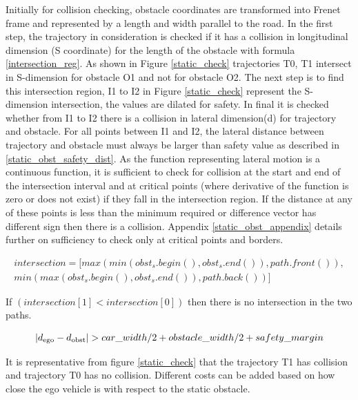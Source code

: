 Initially for collision checking, obstacle coordinates are transformed into Frenet frame and represented by a length and width parallel to the road. In the first step, the trajectory in consideration is checked if it has a collision in longitudinal dimension (S coordinate) for the length of the obstacle with formula \ref{intersection_reg}. As shown in Figure \ref{static_check} trajectories T0, T1 intersect in S-dimension for obstacle O1 and not for obstacle O2. The next step is to find this intersection region, I1 to I2 in Figure \ref{static_check} represent the S-dimension intersection, the values are dilated for safety. In final it is checked whether from I1 to I2 there is a collision in lateral dimension(d) for trajectory and obstacle. For all points between I1 and I2, the lateral distance between trajectory and obstacle must always be larger than safety value as described in \ref{static_obst_safety_dist}. As the function representing lateral motion is a continuous function, it is sufficient to check for collision at the start and end of the intersection interval and at critical points (where derivative of the function is zero or does not exist) if they fall in the intersection region. If the distance at any of these points is less than the minimum required or difference vector has different sign then there is a collision. Appendix \ref{static_obst_appendix} details further on sufficiency to check only at critical points and borders. 

\begin{equation}\label{intersection_reg}
\begin{aligned}
intersection = [max(min(obst_s.begin(),obst_s.end()),path.front()),\\ min(max(obst_s.begin(),obst_s.end()),path.back())]
\end{aligned}
\end{equation}

If $(intersection[1]<intersection[0])$  then there is no intersection in the two paths. 


\begin{equation}
    |d\textsubscript{ego} - d\textsubscript{obst}| > car\_width/2 + obstacle\_width/2 + safety\_margin
    \label{static_obst_safety_dist}
\end{equation}

It is representative from figure \ref{static_check} that the trajectory T1 has collision and trajectory T0 has no collision. Different costs can be added based on how close the ego vehicle is with respect to the static obstacle.  

